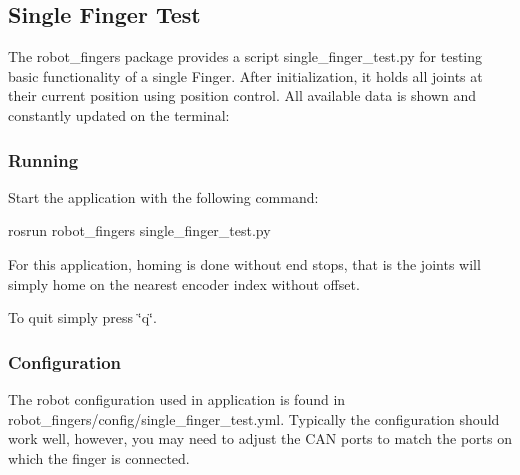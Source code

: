 \subsection*{Single Finger Test }

The {\ttfamily robot\+\_\+fingers} package provides a script {\ttfamily single\+\_\+finger\+\_\+test.\+py} for testing basic functionality of a single Finger. After initialization, it holds all joints at their current position using position control. All available data is shown and constantly updated on the terminal\+:

 \subsubsection*{Running}

Start the application with the following command\+: \begin{DoxyVerb}rosrun robot_fingers single_finger_test.py
\end{DoxyVerb}


For this application, homing is done without end stops, that is the joints will simply home on the nearest encoder index without offset.

To quit simply press \char`\"{}q\char`\"{}.

\subsubsection*{Configuration}

The robot configuration used in application is found in {\ttfamily robot\+\_\+fingers/config/single\+\_\+finger\+\_\+test.\+yml}. Typically the configuration should work well, however, you may need to adjust the C\+AN ports to match the ports on which the finger is connected. 